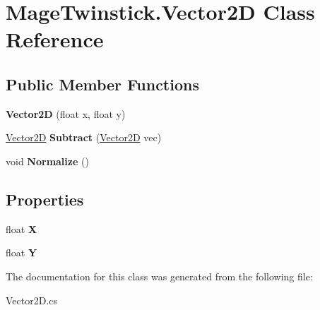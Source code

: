 \hypertarget{class_mage_twinstick_1_1_vector2_d}{}\section{Mage\+Twinstick.\+Vector2\+D Class Reference}
\label{class_mage_twinstick_1_1_vector2_d}
\subsection*{Public Member Functions}
\begin{DoxyCompactItemize}
\item 
\hypertarget{class_mage_twinstick_1_1_vector2_d_a36be1b509d98d7ff48b7fff196a5bf23}{}{\bfseries Vector2\+D} (float x, float y)\label{class_mage_twinstick_1_1_vector2_d_a36be1b509d98d7ff48b7fff196a5bf23}

\item 
\hypertarget{class_mage_twinstick_1_1_vector2_d_a0675eb9cec3cd171d73797698e54f3ba}{}\hyperlink{class_mage_twinstick_1_1_vector2_d}{Vector2\+D} {\bfseries Subtract} (\hyperlink{class_mage_twinstick_1_1_vector2_d}{Vector2\+D} vec)\label{class_mage_twinstick_1_1_vector2_d_a0675eb9cec3cd171d73797698e54f3ba}

\item 
\hypertarget{class_mage_twinstick_1_1_vector2_d_a5b24373bc619c7fc5709bba32ca5303c}{}void {\bfseries Normalize} ()\label{class_mage_twinstick_1_1_vector2_d_a5b24373bc619c7fc5709bba32ca5303c}

\end{DoxyCompactItemize}
\subsection*{Properties}
\begin{DoxyCompactItemize}
\item 
\hypertarget{class_mage_twinstick_1_1_vector2_d_ac750d49285ebcd4e4bb81295f91ab600}{}float {\bfseries X}\label{class_mage_twinstick_1_1_vector2_d_ac750d49285ebcd4e4bb81295f91ab600}

\item 
\hypertarget{class_mage_twinstick_1_1_vector2_d_a0ae54e599156e7c295515bfc80834bfd}{}float {\bfseries Y}\label{class_mage_twinstick_1_1_vector2_d_a0ae54e599156e7c295515bfc80834bfd}

\end{DoxyCompactItemize}


The documentation for this class was generated from the following file\+:\begin{DoxyCompactItemize}
\item 
Vector2\+D.\+cs\end{DoxyCompactItemize}
